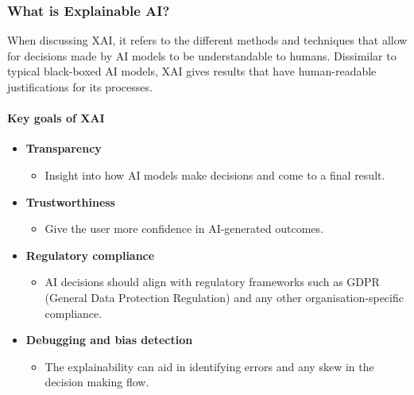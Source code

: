 \subsubsection*{What is Explainable AI?}
When discussing XAI, it refers to the different methods and techniques that allow for decisions made by AI models to be understandable to humans. Dissimilar to typical black-boxed AI models, XAI gives results that have human-readable justifications for its processes.

\paragraph{Key goals of XAI}
\begin{itemize}
    \item \textbf{Transparency}
    \begin{itemize}
        \item Insight into how AI models make decisions and come to a final result.
    \end{itemize}
    \item \textbf{Trustworthiness}
    \begin{itemize}
        \item Give the user more confidence in AI-generated outcomes.
    \end{itemize}
    \item \textbf{Regulatory compliance}
    \begin{itemize}
        \item AI decisions should align with regulatory frameworks such as GDPR (General Data Protection Regulation) and any other organisation-specific compliance.
    \end{itemize}
    \item \textbf{Debugging and bias detection}
    \begin{itemize}
        \item The explainability can aid in identifying errors and any skew in the decision making flow.
    \end{itemize}
\end{itemize}

